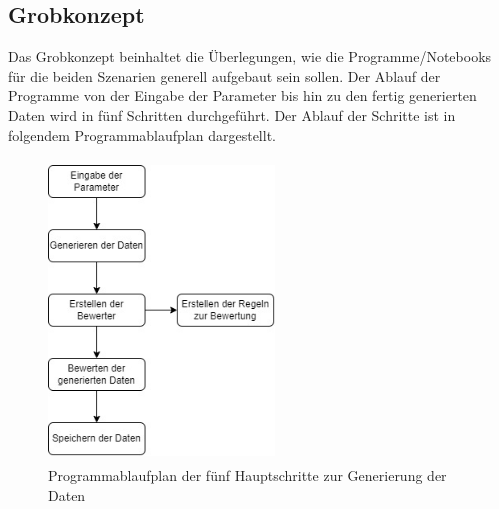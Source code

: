 \begin{onehalfspace}
\subsection{Grobkonzept}
\label{subsubsec:grobkonzept}
Das Grobkonzept beinhaltet die Überlegungen, wie die Programme/Notebooks für die beiden Szenarien generell aufgebaut sein sollen. Der Ablauf der Programme von der Eingabe der Parameter bis hin zu den fertig generierten Daten wird in fünf Schritten durchgeführt. Der Ablauf der Schritte ist in folgendem Programmablaufplan dargestellt.\\
\begin{figure}[h]
    \centering
    \includegraphics[width=6cm,height=8cm]{Diagramme/Grobkonzept_PAP.jpg}
    \caption{Programmablaufplan der fünf Hauptschritte zur Generierung der Daten}
    \label{fig:GrobkonzeptPAP}
\end{figure}\\

\end{onehalfspace}
